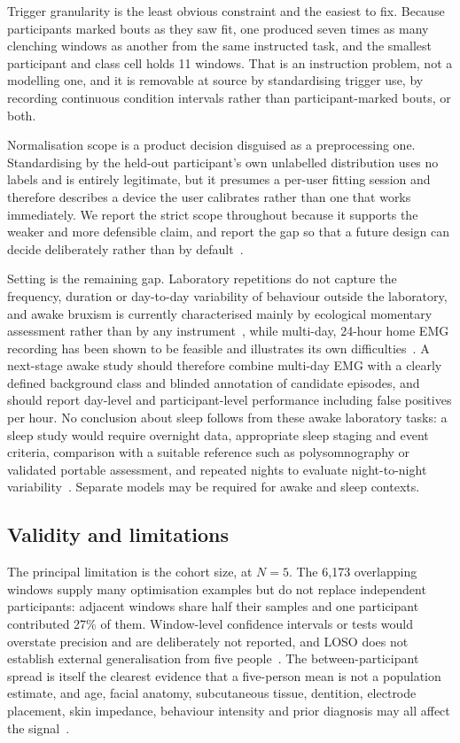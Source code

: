 \documentclass[pdflatex,sn-nature,iicol]{sn-jnl}
\begin{document}
Trigger granularity is the least obvious constraint and the easiest to fix. Because participants marked bouts as they saw fit, one produced seven times as many clenching windows as another from the same instructed task, and the smallest participant and class cell holds 11 windows. That is an instruction problem, not a modelling one, and it is removable at source by standardising trigger use, by recording continuous condition intervals rather than participant-marked bouts, or both.

Normalisation scope is a product decision disguised as a preprocessing one. Standardising by the held-out participant's own unlabelled distribution uses no labels and is entirely legitimate, but it presumes a per-user fitting session and therefore describes a device the user calibrates rather than one that works immediately. We report the strict scope throughout because it supports the weaker and more defensible claim, and report the gap so that a future design can decide deliberately rather than by default~\cite{besomi2020consensus}.

Setting is the remaining gap. Laboratory repetitions do not capture the frequency, duration or day-to-day variability of behaviour outside the laboratory, and awake bruxism is currently characterised mainly by ecological momentary assessment rather than by any instrument~\cite{bracci2018frequency}, while multi-day, 24-hour home EMG recording has been shown to be feasible and illustrates its own difficulties~\cite{colonna2023electromyographic,lobbezoo2020consensus}. A next-stage awake study should therefore combine multi-day EMG with a clearly defined background class and blinded annotation of candidate episodes, and should report day-level and participant-level performance including false positives per hour. No conclusion about sleep follows from these awake laboratory tasks: a sleep study would require overnight data, appropriate sleep staging and event criteria, comparison with a suitable reference such as polysomnography or validated portable assessment, and repeated nights to evaluate night-to-night variability~\cite{lavigne1996sleep,casett2017validity,cidverdejo2024instrumental}. Separate models may be required for awake and sleep contexts.

\subsection{Validity and limitations}

The principal limitation is the cohort size, at $N=5$. The 6,173 overlapping windows supply many optimisation examples but do not replace independent participants: adjacent windows share half their samples and one participant contributed 27\% of them. Window-level confidence intervals or tests would overstate precision and are deliberately not reported, and LOSO does not establish external generalisation from five people~\cite{varoquaux2018cross}. The between-participant spread is itself the clearest evidence that a five-person mean is not a population estimate, and age, facial anatomy, subcutaneous tissue, dentition, electrode placement, skin impedance, behaviour intensity and prior diagnosis may all affect the signal~\cite{besomi2019consensus,hermens2000development}.
\end{document}
